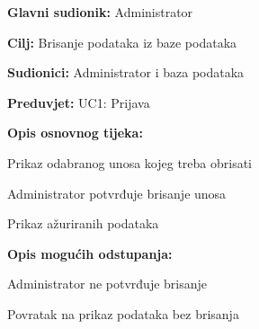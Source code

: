 					
					\noindent {}
					\begin{packed_item}
						
						\item \textbf{Glavni sudionik: }Administrator
						\item  \textbf{Cilj:} Brisanje podataka iz baze podataka
						\item  \textbf{Sudionici:} Administrator i baza podataka
						\item  \textbf{Preduvjet:} UC1: Prijava
						\item  \textbf{Opis osnovnog tijeka:}
						
						\item[] \begin{packed_enum}
							
							\item Prikaz odabranog unosa kojeg treba obrisati
							\item Administrator potvrđuje brisanje unosa
							\item Prikaz ažuriranih podataka 
							
						\end{packed_enum}
						
						\item  \textbf{Opis mogućih odstupanja:}
						
						\item[] \begin{packed_item}
							
							\item[2.a] Administrator ne potvrđuje brisanje
							\item[] \begin{packed_enum}
								
								\item Povratak na prikaz podataka bez brisanja
								
							\end{packed_enum}
							
						\end{packed_item}
					\end{packed_item}
					
